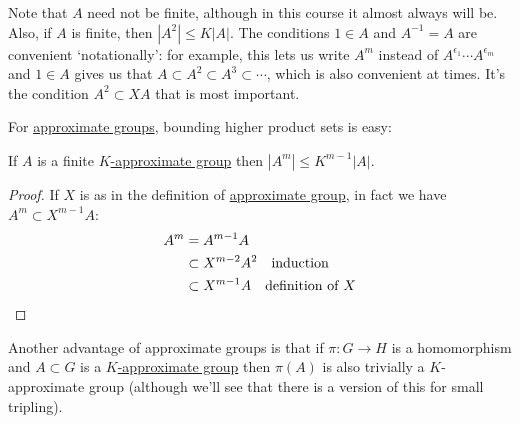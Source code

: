 \documentclass{article}
\numberwithin{equation}{section}
\begin{document}
Note that $A$ need not be finite, although in this course it almost always will be.
Also, if $A$ is finite, then $|A^2| \leq K|A|$.
The conditions $1 \in A$ and $A^{-1} = A$ are convenient `notationally': for example, this lets us write $A^m$ instead of $A^{\epsilon_1} \dotsm A^{\epsilon_m}$ and $1 \in A$ gives us that $A \subset A^2 \subset A^3 \subset \dotsb$, which is also convenient at times.
It's the condition $A^2 \subset XA$ that is most important.

For \hyperlink{def:appGroup}{approximate groups}, bounding higher product sets is easy:
\begin{nlemma}\label{lem:3.1}
  If $A$ is a finite \hyperlink{def:appGroup}{$K$-approximate group} then $|A^m| \leq K^{m-1} |A|$.
\end{nlemma}
\begin{proof}
  If $X$ is as in the definition of \hyperlink{def:appGroup}{approximate group}, in fact we have $A^m \subset X^{m-1} A$:
  \begin{align*}
    A^m &= A^{m-1} A \\
        &\subset X^{m-2} A^2 \quad \text{induction}\\
        &\subset X^{m-1} A \quad \text{definition of $X$} \qedhere
  \end{align*}
\end{proof}
Another advantage of approximate groups is that if $\pi: G \to H$ is a homomorphism and $A \subset G$ is a \hyperlink{def:appGroup}{$K$-approximate group} then $\pi(A)$ is also trivially a $K$-approximate group (although we'll see that there is a version of this for small tripling).
\end{document}

